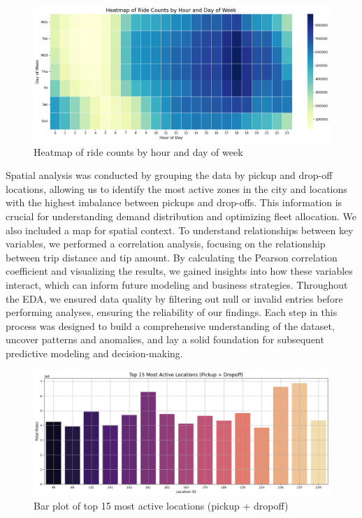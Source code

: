 \documentclass[conference]{IEEEtran}
\begin{document}
\begin{figure}[h]
  \includegraphics[width=\linewidth]{eda-heatmap.png}
  \centering
  \caption{Heatmap of ride counts by hour and day of week}
\end{figure}

Spatial analysis was conducted by grouping the data by pickup and drop-off locations, allowing us to identify the most active zones in the city and locations with the highest imbalance between pickups and drop-offs. This information is crucial for understanding demand distribution and optimizing fleet allocation. We also included a map for spatial context. To understand relationships between key variables, we performed a correlation analysis, focusing on the relationship between trip distance and tip amount. By calculating the Pearson correlation coefficient and visualizing the results, we gained insights into how these variables interact, which can inform future modeling and business strategies. Throughout the EDA, we ensured data quality by filtering out null or invalid entries before performing analyses, ensuring the reliability of our findings. Each step in this process was designed to build a comprehensive understanding of the dataset, uncover patterns and anomalies, and lay a solid foundation for subsequent predictive modeling and decision-making.

\begin{figure}[h]
  \includegraphics[width=\linewidth]{eda-top-locations.png}
  \centering
  \caption{Bar plot of top 15 most active locations (pickup + dropoff)}
\end{figure}
\end{document}
